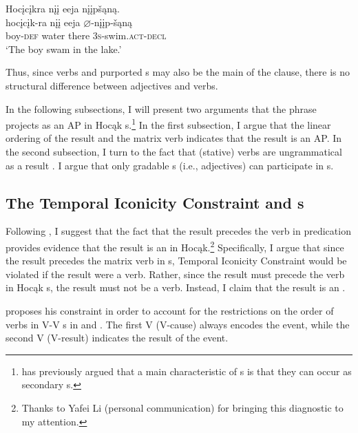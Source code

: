 \documentclass[output=paper]{LSP/langsci}
\begin{document}
\ex \glll Hocįcįkra nįį eeja nįįpšąną.\\
hocįcįk-ra nįį eeja {$\varnothing$}-nįįp-šąną\\
boy-\textsc{def} water there \textsc{3s}-swim.\textsc{act}-\textsc{decl}\\
\glt `The boy swam in the lake.'
\z
\z

Thus, since verbs and purported s may also be the main  of the clause, there is no structural difference between adjectives and verbs.

 
In the following subsections, I 
will present two arguments that the  phrase projects as an AP in Hocąk s.\footnote{\citet{Baker2003} has previously argued that a main characteristic of s is that they can occur as secondary  s.} In the first subsection, I argue that the linear ordering of the result and the matrix verb indicates that the result is an AP. In the second subsection, I turn to the fact that (stative) verbs are ungrammatical as a result . I argue that only gradable s (i.e., adjectives) can participate in s. 
 

\subsection{The Temporal Iconicity Constraint and s}
 
Following \citet{Li1993}, I suggest that the fact that the result precedes the verb in  predication provides evidence that the result is an  in Hocąk.\footnote{Thanks to Yafei Li (personal communication) for bringing this diagnostic to my attention.} Specifically, I argue that since the result precedes the matrix verb in s,  Temporal Iconicity Constraint would be violated if the result were a verb. Rather, since the result must precede the verb in Hocąk s, the result must not be a verb. Instead, I claim that the result is an .
 

\citet[499]{Li1993} proposes his constraint in order to account for the restrictions on the order of verbs in V-V  s in  and . The first V (V-cause) always encodes the event, while the second V (V-result) indicates the result of the event. 
\end{document}
